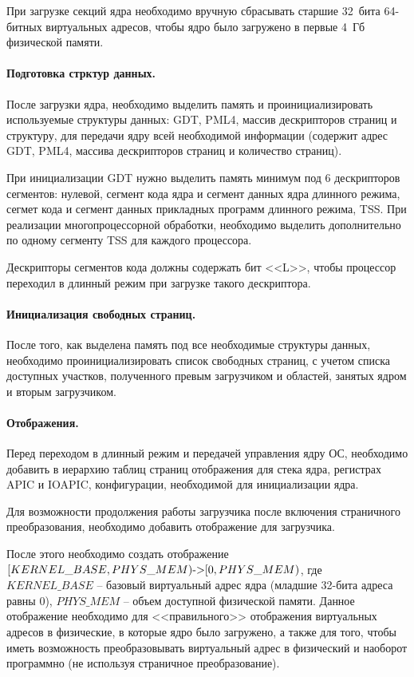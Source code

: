 При загрузке секций ядра необходимо вручную сбрасывать старшие 32~бита 64-битных виртуальных адресов,
чтобы ядро было загружено в первые 4~Гб физической памяти.

\paragraph{Подготовка стрктур данных.} После загрузки ядра, необходимо выделить память и проинициализировать
используемые структуры данных: GDT, PML4, массив дескрипторов страниц и структуру, для передачи
ядру всей необходимой информации (содержит адрес GDT, PML4, массива дескрипторов страниц и количество страниц).

При инициализации GDT нужно выделить память минимум под 6 дескрипторов сегментов:
нулевой, сегмент кода ядра и сегмент данных ядра длинного режима, сегмет кода
и сегмент данных прикладных программ длинного режима, TSS. При реализации многопроцессорной
обработки, необходимо выделить дополнительно по одному сегменту TSS для каждого процессора.

Дескрипторы сегментов кода должны содержать бит <<L>>, чтобы процессор переходил в длинный
режим при загрузке такого дескриптора.

\paragraph{Инициализация свободных страниц.} После того, как выделена память под все
необходимые структуры данных, необходимо проинициализировать список свободных страниц,
с учетом списка доступных участков, полученного превым загрузчиком и областей,
занятых ядром и вторым загрузчиком.

\paragraph{Отображения.} Перед переходом в длинный режим и передачей управления ядру ОС,
необходимо добавить в иерархию таблиц страниц отображения для стека ядра, регистрах APIC и IOAPIC,
конфигурации, необходимой для инициализации ядра.

Для возможности продолжения работы загрузчика после включения страничного преобразования,
необходимо добавить отображение для загрузчика.

После этого необходимо создать отображение $[KERNEL\_BASE, PHYS\_MEM) \textup{->} [0, PHYS\_MEM)$,
где $KERNEL\_BASE$ -- базовый виртуальный адрес ядра (младшие 32-бита адреса равны 0), $PHYS\_MEM$ --
объем доступной физической памяти. Данное отображение необходимо для <<правильного>> отображения
виртуальных адресов в физические, в которые ядро было загружено, а также для того, чтобы иметь
возможность преобразовывать виртуальный адрес в физический и наоборот программно (не используя
страничное преобразование).

